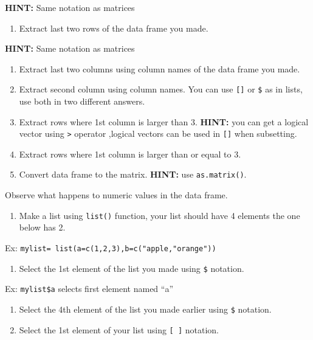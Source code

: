 \documentclass[12pt,]{krantz}
\providecommand{\tightlist}{%
  \setlength{\itemsep}{0pt}\setlength{\parskip}{0pt}}
\theoremstyle{definition}
\theoremstyle{definition}
\theoremstyle{definition}
\theoremstyle{remark}
\begin{document}
\textbf{HINT:} Same notation as matrices

\begin{enumerate}
\def\labelenumi{\arabic{enumi}.}
\setcounter{enumi}{27}
\tightlist
\item
  Extract last two rows of the data frame you made.
\end{enumerate}

\textbf{HINT:} Same notation as matrices

\begin{enumerate}
\def\labelenumi{\arabic{enumi}.}
\setcounter{enumi}{28}
\item
  Extract last two columns using column names of the data frame you
  made.
\item
  Extract second column using column names. You can use \texttt{{[}{]}}
  or \texttt{\$} as in lists, use both in two different answers.
\item
  Extract rows where 1st column is larger than 3. \textbf{HINT:} you can
  get a logical vector using \texttt{\textgreater{}} operator ,logical
  vectors can be used in \texttt{{[}{]}} when subsetting.
\item
  Extract rows where 1st column is larger than or equal to 3.
\item
  Convert data frame to the matrix. \textbf{HINT:} use
  \texttt{as.matrix()}.
\end{enumerate}

Observe what happens to numeric values in the data frame.

\begin{enumerate}
\def\labelenumi{\arabic{enumi}.}
\setcounter{enumi}{33}
\tightlist
\item
  Make a list using \texttt{list()} function, your list should have 4
  elements the one below has 2.
\end{enumerate}

Ex: \texttt{mylist=\ list(a=c(1,2,3),b=c("apple,"orange"))}

\begin{enumerate}
\def\labelenumi{\arabic{enumi}.}
\setcounter{enumi}{34}
\tightlist
\item
  Select the 1st element of the list you made using \texttt{\$}
  notation.
\end{enumerate}

Ex: \texttt{mylist\$a} selects first element named ``a''

\begin{enumerate}
\def\labelenumi{\arabic{enumi}.}
\setcounter{enumi}{35}
\item
  Select the 4th element of the list you made earlier using \texttt{\$}
  notation.
\item
  Select the 1st element of your list using \texttt{{[}\ {]}} notation.
\end{enumerate}
\end{document}
